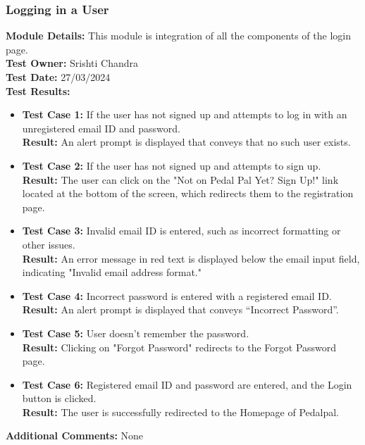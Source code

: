 \documentclass[11pt]{article}
\begin{document}
\subsubsection{Logging in a User}
\textbf{Module Details: }This module is integration of all the components of the login page.
\\
\textbf{Test Owner: }Srishti Chandra
\\
\textbf{Test Date: }27/03/2024
\\
\textbf{Test Results: }
\begin{itemize}
    \item \textbf{Test Case 1: }If the user has not signed up and attempts to log in with an unregistered email ID and password.
    \\
    \textbf{Result: }An alert prompt is displayed that conveys that no such user exists.

    \item \textbf{Test Case 2: }If the user has not signed up and attempts to sign up.
    \\
    \textbf{Result: }The user can click on the "Not on Pedal Pal Yet? Sign Up!" link located at the bottom of the screen, which redirects them to the registration page.

    \item \textbf{Test Case 3: }Invalid email ID is entered, such as incorrect formatting or other issues.
    \\
    \textbf{Result: }An error message in red text is displayed below the email input field, indicating "Invalid email address format."

    \item \textbf{Test Case 4: }Incorrect password is entered with a registered email ID.
    \\
    \textbf{Result: }An alert prompt is displayed that conveys “Incorrect  Password”.

    \item \textbf{Test Case 5: }User doesn’t remember the password.
    \\
    \textbf{Result: }Clicking on "Forgot Password" redirects to the Forgot Password page.

    \item \textbf{Test Case 6: }Registered email ID and password are entered, and the Login button is clicked.
    \\
    \textbf{Result: }The user is successfully redirected to the Homepage of Pedalpal.

\end{itemize}
\textbf{Additional Comments: }None
\end{document}
